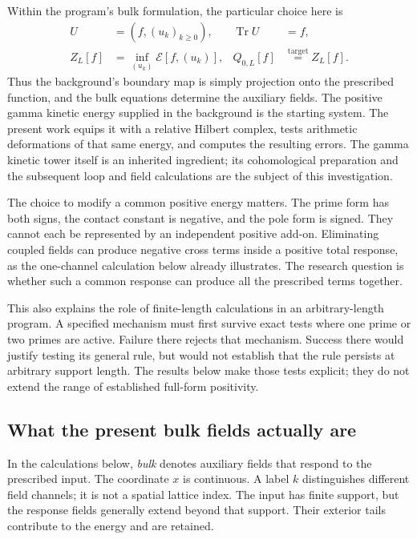 \documentclass[11pt]{article}
\numberwithin{equation}{section}
\theoremstyle{definition}
\theoremstyle{remark}
\begin{document}
Within the program's bulk formulation, the particular choice here is
\[
\begin{aligned}
U&=(f,(u_k)_{k\geq0}), &\operatorname{Tr}U&=f,\\
Z_L[f]&=\inf_{(u_k)}\mathcal E[f,(u_k)],
& Q_{0,L}[f]&\stackrel{\text{target}}{=}Z_L[f].
\end{aligned}
\]
Thus the background's boundary map is simply projection onto the prescribed function, and the bulk equations determine the auxiliary fields. The positive gamma kinetic energy supplied in the background is the starting system. The present work equips it with a relative Hilbert complex, tests arithmetic deformations of that same energy, and computes the resulting errors. The gamma kinetic tower itself is an inherited ingredient; its cohomological preparation and the subsequent loop and field calculations are the subject of this investigation.

The choice to modify a common positive energy matters. The prime form has both signs, the contact constant is negative, and the pole form is signed. They cannot each be represented by an independent positive add-on. Eliminating coupled fields can produce negative cross terms inside a positive total response, as the one-channel calculation below already illustrates. The research question is whether such a common response can produce all the prescribed terms together.

This also explains the role of finite-length calculations in an arbitrary-length program. A specified mechanism must first survive exact tests where one prime or two primes are active. Failure there rejects that mechanism. Success there would justify testing its general rule, but would not establish that the rule persists at arbitrary support length. The results below make those tests explicit; they do not extend the range of established full-form positivity.

\subsection*{What the present bulk fields actually are}
In the calculations below, \emph{bulk} denotes auxiliary fields that respond to the prescribed input. The coordinate $x$ is continuous. A label $k$ distinguishes different field channels; it is not a spatial lattice index. The input has finite support, but the response fields generally extend beyond that support. Their exterior tails contribute to the energy and are retained.
\end{document}
